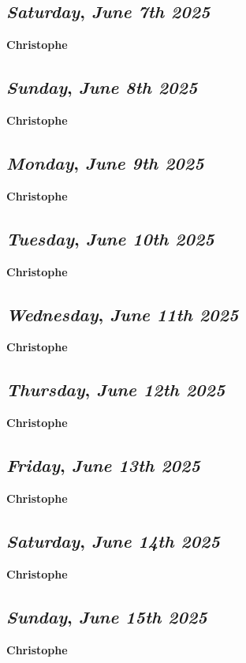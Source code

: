 \def\day{\textit{June 7th 2025}}
\def\weekday{\textit{Saturday}}
\subsection*{\weekday, \day}
\textbf {Christophe}

\def\day{\textit{June 8th 2025}}
\def\weekday{\textit{Sunday}}
\subsection*{\weekday, \day}
\textbf {Christophe}

\def\day{\textit{June 9th 2025}}
\def\weekday{\textit{Monday}}
\subsection*{\weekday, \day}
\textbf {Christophe}

\def\day{\textit{June 10th 2025}}
\def\weekday{\textit{Tuesday}}
\subsection*{\weekday, \day}
\textbf {Christophe}

\def\day{\textit{June 11th 2025}}
\def\weekday{\textit{Wednesday}}
\subsection*{\weekday, \day}
\textbf {Christophe}

\def\day{\textit{June 12th 2025}}
\def\weekday{\textit{Thursday}}
\subsection*{\weekday, \day}
\textbf {Christophe}

\def\day{\textit{June 13th 2025}}
\def\weekday{\textit{Friday}}
\subsection*{\weekday, \day}
\textbf {Christophe}

\def\day{\textit{June 14th 2025}}
\def\weekday{\textit{Saturday}}
\subsection*{\weekday, \day}
\textbf {Christophe}

\def\day{\textit{June 15th 2025}}
\def\weekday{\textit{Sunday}}
\subsection*{\weekday, \day}
\textbf {Christophe}


